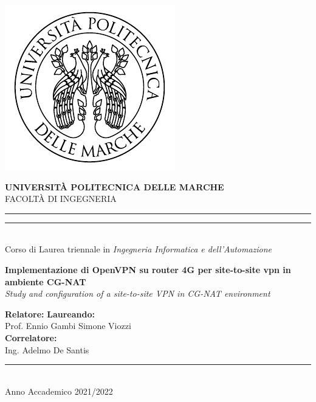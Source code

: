 \begin{titlepage}

\begin{center}
\includegraphics[scale=0.85]{immagini/UnivpmLogo.pdf} \\
\vspace{5mm}

{{\Large{\textbf{\large{UNIVERSITÀ POLITECNICA DELLE MARCHE}}}}} \\
\vspace{3mm}
\small{FACOLTÀ DI INGEGNERIA}\\
\vspace{3.5mm}

\rule[0.1cm]{\textwidth}{0.1mm}
\rule[0.5cm]{\textwidth}{0.6mm} 
\\

\large{{Corso di Laurea triennale in \textit{Ingegneria Informatica e dell'Automazione}}} \\

\end{center}

\vspace{18mm}
\begin{center}
{\LARGE{\bf Implementazione di OpenVPN su router 4G per site-to-site vpn in ambiente CG-NAT}}\\
\vspace{6mm}
\Large{\textit{Study and configuration of a site-to-site VPN in CG-NAT environment}}\\
\vspace{15mm}
\end{center}

\vspace{20mm}


\noindent
\textbf{Relatore:}
\hfill
\textbf{Laureando:} \\
\noindent
Prof. Ennio Gambi
\hfill
Simone Viozzi \\
\noindent
\textbf{Correlatore:} \\
Ing. Adelmo De Santis



\vfill
\begin{center}
\rule[0.1cm]{\textwidth}{0.1mm} \\
{\large{
Anno Accademico 2021/2022 }}
\end{center}
\end{titlepage}
\restoregeometry
